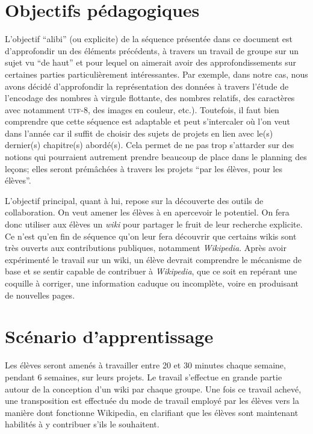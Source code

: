 \documentclass[11pt,bibliography=totoc]{scrartcl}
\begin{document}
\section{Objectifs pédagogiques}
L'objectif ``alibi'' (ou explicite) de la séquence présentée dans ce document
est d'approfondir un des éléments précédents, à travers un travail de groupe sur
un sujet vu ``de haut'' et pour lequel on aimerait avoir des approfondissements
sur certaines parties particulièrement intéressantes.  Par exemple, dans notre
cas, nous avons décidé d'approfondir la représentation des données à travers
l'étude de l'encodage des nombres à virgule flottante, des nombres relatifs, des
caractères avec notamment \textsc{utf}-8, des images en couleur, etc.).
Toutefois, il faut bien comprendre que cette séquence est adaptable et peut
s'intercaler où l'on veut dans l'année car il suffit de choisir des sujets de
projets en lien avec le(s) dernier(s) chapitre(s) abordé(s). Cela permet de ne
pas trop s'attarder sur des notions qui pourraient autrement prendre beaucoup de
place dans le planning des leçons; elles seront prémâchées à travers les projets
``par les élèves, pour les élèves''.

L'objectif principal, quant à lui, repose sur la découverte des outils de
collaboration. On veut amener les élèves à en apercevoir le potentiel.  On fera
donc utiliser aux élèves un \textit{wiki} pour partager le fruit de leur
recherche explicite.  Ce n'est qu'en fin de séquence qu'on leur fera découvrir
que certains wikis sont très ouverts aux contributions publiques, notamment
\textit{Wikipedia}.  Après avoir expérimenté le travail sur un wiki, un élève
devrait comprendre le mécanisme de base et se sentir capable de contribuer à
\textit{Wikipedia}, que ce soit en repérant une coquille à corriger, une
information caduque ou incomplète, voire en produisant de nouvelles pages.


\section{Scénario d'apprentissage}
Les élèves seront amenés à travailler entre 20 et 30 minutes chaque semaine,
pendant 6 semaines, sur leurs projets. Le travail s'effectue en grande
partie autour de la conception d'un wiki par chaque groupe. Une fois ce travail
achevé, une transposition est effectuée du mode de travail employé par les
élèves vers la manière dont fonctionne Wikipedia, en clarifiant que les élèves
sont maintenant habilités à y contribuer s'ils le souhaitent.
\end{document}
